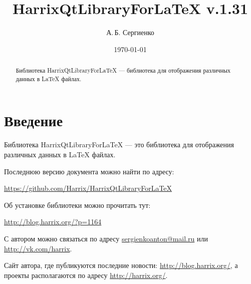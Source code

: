\documentclass[a4paper,12pt]{article}
\title{HarrixQtLibraryForLaTeX v.1.31}
\author{А.\,Б. Сергиенко}
\date{\today}
\begin{document}


\maketitle

\begin{abstract}
Библиотека HarrixQtLibraryForLaTeX --- библиотека для отображения различных данных в LaTeX файлах.
\end{abstract}

\tableofcontents

\newpage

\section{Введение}

Библиотека HarrixQtLibraryForLaTeX --- это библиотека для отображения различных данных в LaTeX файлах.

Последнюю версию документа можно найти по адресу:

\href{https://github.com/Harrix/HarrixQtLibraryForLaTeX}{https://github.com/Harrix/HarrixQtLibraryForLaTeX}

Об установке библиотеки можно прочитать тут:

\href{http://blog.harrix.org/?p=1164}{http://blog.harrix.org/?p=1164}

С автором можно связаться по адресу \href{mailto:sergienkoanton@mail.ru}{sergienkoanton@mail.ru} или  \href{http://vk.com/harrix}{http://vk.com/harrix}.

Сайт автора, где публикуются последние новости: \href{http://blog.harrix.org/}{http://blog.harrix.org/}, а проекты располагаются по адресу \href{http://harrix.org/}{http://harrix.org/}.

\newpage
\end{document}

